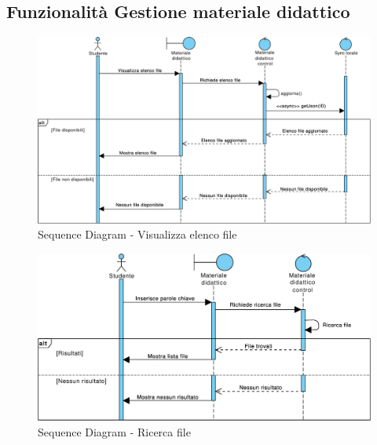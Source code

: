 \subsection{Funzionalità Gestione materiale didattico}
\clearpage
\begin{figure}
	\centering
	\includegraphics[width=6.5in]{imgs/gruppo1/sequence_diagrams/SD13_visualizza_elenco_file.pdf}
	\caption{Sequence Diagram - Visualizza elenco file}
	\label{diag:visualizzaElencoFileSD}
\end{figure}

\begin{figure}
	\centering
	\includegraphics[width=6.5in]{imgs/gruppo1/sequence_diagrams/SD14_ricerca_file.pdf}
	\caption{Sequence Diagram - Ricerca file}
	\label{diag:ricercaFileSD}
\end{figure}
\newpage

